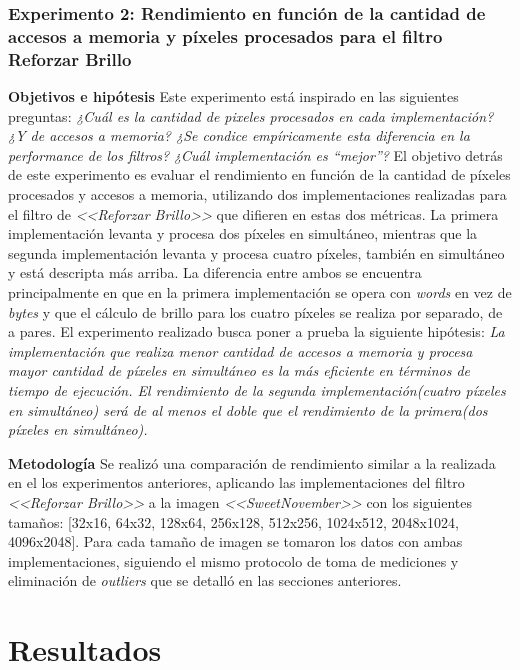 \documentclass[a4paper]{article}
\begin{document}
\subsubsection{Experimento 2: Rendimiento en función de la cantidad de accesos a memoria y píxeles procesados para el filtro Reforzar Brillo}

\justify
\textbf{Objetivos e hipótesis}
\justify
Este experimento está inspirado en las siguientes preguntas:
\justify
\textit{¿Cuál es la cantidad de pixeles procesados en cada implementación? ¿Y de accesos a memoria? ¿Se condice empíricamente esta diferencia en la performance de los filtros?} \textit{¿Cuál implementación es “mejor”?}	 
\justify
El objetivo detrás de este experimento es evaluar el rendimiento en función de la cantidad de píxeles procesados y accesos a memoria, utilizando dos implementaciones realizadas para el filtro de \textit{<<Reforzar Brillo>>} que difieren en estas dos métricas. La primera implementación levanta y procesa dos píxeles en simultáneo, mientras que la segunda implementación levanta y procesa cuatro píxeles, también en simultáneo y está descripta más arriba. La diferencia entre ambos se encuentra principalmente en que en la primera implementación se opera con \textit{words} en vez de \textit{bytes} y que el cálculo de brillo para los cuatro píxeles se realiza por separado, de a pares. El experimento realizado busca poner a prueba la siguiente hipótesis:
\justify
\textit{La implementación que realiza menor cantidad de accesos a memoria y procesa mayor cantidad de píxeles en simultáneo es la más eficiente en términos de tiempo de ejecución. El rendimiento de la segunda implementación(cuatro píxeles en simultáneo) será de al menos el doble que el rendimiento de la primera(dos píxeles en simultáneo). }

\justify
\textbf{Metodología}
\justify
Se realizó una comparación de rendimiento similar a la realizada en el los experimentos anteriores, aplicando las implementaciones del filtro \textit{<<Reforzar Brillo>>} a la imagen \textit{<<SweetNovember>>} con los siguientes tamaños: [32x16, 64x32, 128x64, 256x128, 512x256, 1024x512, 2048x1024, 4096x2048]. 
\justify
Para cada tamaño de imagen se tomaron los datos con ambas implementaciones, siguiendo el mismo protocolo de toma de mediciones y eliminación de \textit{outliers} que se detalló en las secciones anteriores.

\section{Resultados}
\end{document}
